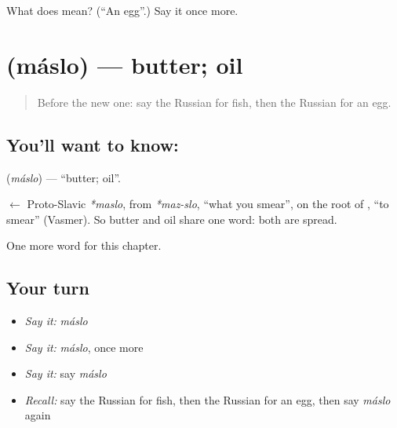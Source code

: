 \begin{tcolorbox}[breakable,colback=teal!4,colframe=teal!35!black,title={Before you move on}]
What does  mean? (\textquotedblleft{}An egg\textquotedblright{}.) Say it once more.
\end{tcolorbox}
\section[\texorpdfstring{\ru{масло} (máslo)}{масло (máslo)}]{ (máslo) — butter; oil}

\label{lesson:RU-C43-butter}



\begin{quote}
Before the new one: say the Russian for fish, then the Russian for an egg.
\end{quote}

\subsection*{You'll want to know: }
\textbf{} (\emph{máslo}) — \textquotedblleft{}butter; oil\textquotedblright{}.

\begin{cousinweb}
\textbf{} $\leftarrow$ Proto-Slavic \emph{*maslo}, from \emph{*maz-slo}, \textquotedblleft{}what you smear\textquotedblright{}, on the root of \emph{}, \textquotedblleft{}to smear\textquotedblright{} (Vasmer). So butter and oil share one word: both are spread.
\end{cousinweb}

\begin{grammarlens}[title={What you've built}]
One more word for this chapter.
\end{grammarlens}

\subsection*{Your turn}
\begin{itemize}
\raggedright
  \item \emph{Say it:} \emph{máslo}
  \item \emph{Say it:} \emph{máslo}, once more
  \item \emph{Say it:} say \emph{máslo}
  \item \emph{Recall:} say the Russian for fish, then the Russian for an egg, then say \emph{máslo} again
\end{itemize}

